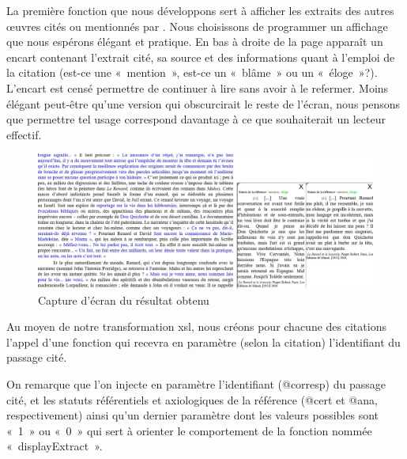 \documentclass[12pt, a4paper]{article}
\begin{document}
La première fonction que nous développons sert à afficher les extraits des autres œuvres cités ou mentionnés par \robbe. Nous choisissons de programmer un affichage que nous espérons élégant et pratique. En bas à droite de la page apparaît un encart contenant l'extrait cité, sa source et des informations quant à l'emploi de la citation (est-ce une «~mention~», est-ce un «~blâme~» ou un «~éloge~»?). L'encart est censé permettre de continuer à lire \punr{} sans avoir à le refermer. Moins élégant peut-être qu'une version qui obscurcirait le reste de l'écran, nous pensons que permettre tel usage correspond davantage à ce que souhaiterait un lecteur effectif.
\begin{figure}[H]
    \centering
    \includegraphics[scale=0.3]{img/screen_quote_result.jpg}
    \caption{Capture d'écran du résultat obtenu}
    \label{fig:quote}
\end{figure}


Au moyen de notre transformation xsl, nous créons pour chacune des citations l'appel d'une fonction qui recevra en paramètre (selon la citation) l'identifiant du passage cité.


On remarque que l'on injecte en paramètre l'identifiant (@corresp) du passage cité, et les statuts référentiels et axiologiques de la référence (@cert et @ana, respectivement) ainsi qu'un dernier paramètre dont les valeurs possibles sont «~1~» ou «~0~» qui sert à orienter le comportement de la fonction nommée «~displayExtract~».
\end{document}

